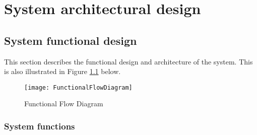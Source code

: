 \documentclass[Main]{subfiles}
\begin{document}
\chapter{System architectural design}
\section{System functional design}
This section describes the functional design and architecture of the system.
This is also illustrated in Figure \ref{fig:FFD} below.

\begin{figure}[H]
\centering
\texttt{[image: FunctionalFlowDiagram]}
\caption{Functional Flow Diagram}
\label{fig:FFD}
\end{figure}

\subsection{System functions}
\end{document}
